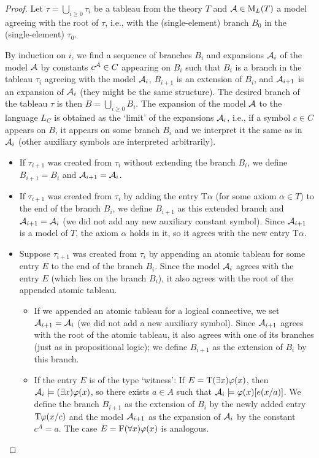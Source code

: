 \begin{proof}
    Let $\tau=\bigcup_{i\geq 0}\tau_i$ be a tableau from the theory $T$ and $\mathcal{A}\in\operatorname{M}_L(T)$ a model agreeing with the root of $\tau$, i.e., with the (single-element) branch $B_0$ in the (single-element) $\tau_0$.
    
    By induction on $i$, we find a sequence of branches $B_i$ and expansions $\mathcal{A}_i$ of the model $\mathcal{A}$ by constants $c^{\mathcal{A}}\in C$ appearing on $B_i$ such that $B_i$ is a branch in the tableau $\tau_i$ agreeing with the model $\mathcal{A}_i$, $B_{i+1}$ is an extension of $B_i$, and $\mathcal{A}_{i+1}$ is an expansion of $\mathcal{A}_i$ (they might be the same structure). The desired branch of the tableau $\tau$ is then $B=\bigcup_{i\geq 0}B_i$. The expansion of the model $\mathcal{A}$ to the language $L_C$ is obtained as the `limit' of the expansions $\mathcal{A}_i$, i.e., if a symbol $c\in C$ appears on $B$, it appears on some branch $B_i$ and we interpret it the same as in $\mathcal{A}_i$ (other auxiliary symbols are interpreted arbitrarily).
    \begin{itemize}
        \item If $\tau_{i+1}$ was created from $\tau_i$ without extending the branch $B_i$, we define $B_{i+1}=B_i$ and $\mathcal{A}_{i+1}=\mathcal{A}_{i}$.
        \item If $\tau_{i+1}$ was created from $\tau_i$ by adding the entry $\mathrm{T}\alpha$ (for some axiom $\alpha\in T$) to the end of the branch $B_i$, we define $B_{i+1}$ as this extended branch and $\mathcal{A}_{i+1}=\mathcal{A}_i$ (we did not add any new auxiliary constant symbol). Since $\mathcal{A}_{i+1}$ is a model of $T$, the axiom $\alpha$ holds in it, so it agrees with the new entry $\mathrm{T}\alpha$.
        \item Suppose $\tau_{i+1}$ was created from $\tau_i$ by appending an atomic tableau for some entry $E$ to the end of the branch $B_i$. Since the model $\mathcal{A}_i$ agrees with the entry $E$ (which lies on the branch $B_i$), it also agrees with the root of the appended atomic tableau.
        \begin{itemize}
            \item If we appended an atomic tableau for a logical connective, we set $\mathcal{A}_{i+1}=\mathcal{A}_i$ (we did not add a new auxiliary symbol). Since $\mathcal{A}_{i+1}$ agrees with the root of the atomic tableau, it also agrees with one of its branches (just as in propositional logic); we define $B_{i+1}$ as the extension of $B_i$ by this branch.
            \item If the entry $E$ is of the type `witness': If $E=\mathrm{T}(\exists x)\varphi(x)$, then $\mathcal{A}_i\models(\exists x)\varphi(x)$, so there exists $a\in A$ such that $\mathcal{A}_i\models\varphi(x)[e(x/a)]$. We define the branch $B_{i+1}$ as the extension of $B_i$ by the newly added entry $\mathrm{T}\varphi(x/c)$ and the model $\mathcal{A}_{i+1}$ as the expansion of $\mathcal{A}_i$ by the constant $c^A=a$. The case $E=\mathrm{F}(\forall x)\varphi(x)$ is analogous.

\end{itemize}
\end{itemize}
\end{proof}
